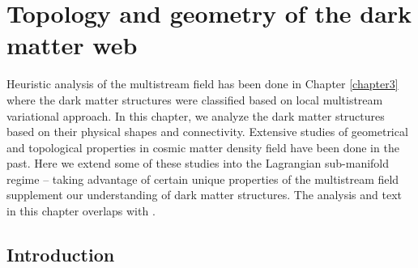 \chapter{Topology and geometry of the dark matter web}\label{chapter4}

Heuristic analysis of the multistream field has been done in Chapter \ref{chapter3} where the dark matter structures were classified based on local multistream variational approach. In this chapter, we analyze the dark matter structures based on their physical shapes and connectivity. Extensive studies of geometrical and topological properties in cosmic matter density field have been done in the past. Here we extend some of these studies into the Lagrangian sub-manifold regime -- taking advantage of certain unique properties of the multistream field supplement our understanding of dark matter structures. The analysis and text in this chapter overlaps with \cite{Ramachandra2017}.   


\section{Introduction} 
\label{sec:intro}


